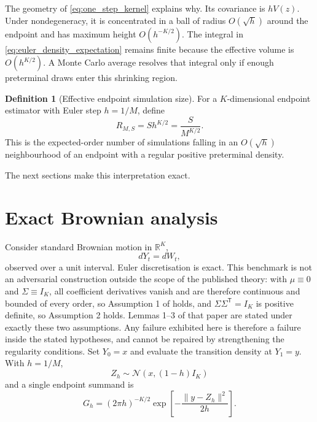 \documentclass[11pt]{article}
\theoremstyle{definition}
\newtheorem{definition}{Definition}
\newcommand{\R}{\mathbb{R}}
\newcommand{\Normal}{\mathcal{N}}
\begin{document}
The geometry of \eqref{eq:one_step_kernel} explains why. Its covariance is $hV(z)$. Under nondegeneracy, it is concentrated in a ball of radius $O(\sqrt h)$ around the endpoint and has maximum height $O(h^{-K/2})$. The integral in \eqref{eq:euler_density_expectation} remains finite because the effective volume is $O(h^{K/2})$. A Monte Carlo average resolves that integral only if enough preterminal draws enter this shrinking region.

\begin{definition}[Effective endpoint simulation size]\label{def:effective_size}
For a $K$-dimensional endpoint estimator with Euler step $h=1/M$, define
\begin{equation}\label{eq:effective_size}
R_{M,S}=S h^{K/2}=\frac{S}{M^{K/2}}.
\end{equation}
This is the expected-order number of simulations falling in an $O(\sqrt h)$ neighbourhood of an endpoint with a regular positive preterminal density.
\end{definition}

The next sections make this interpretation exact.

\section{Exact Brownian analysis}\label{sec:brownian}

Consider standard Brownian motion in $\R^K$,
\begin{equation}\label{eq:brownian}
dY_t=dW_t,
\end{equation}
observed over a unit interval. Euler discretisation is exact. This benchmark is not an adversarial construction outside the scope of the published theory: with $\mu\equiv0$ and $\Sigma\equiv I_K$, all coefficient derivatives vanish and are therefore continuous and bounded of every order, so Assumption 1 of \citet{BrandtSantaClara2002} holds, and $\Sigma\Sigma^{\mathsf T}=I_K$ is positive definite, so Assumption 2 holds. Lemmas 1--3 of that paper are stated under exactly these two assumptions. Any failure exhibited here is therefore a failure inside the stated hypotheses, and cannot be repaired by strengthening the regularity conditions. Set $Y_0=x$ and evaluate the transition density at $Y_1=y$. With $h=1/M$,
\[
Z_h\sim\Normal(x,(1-h)I_K)
\]
and a single endpoint summand is
\begin{equation}\label{eq:brownian_summand}
G_h
=(2\pi h)^{-K/2}
\exp\!\left[-\frac{\|y-Z_h\|^2}{2h}\right].
\end{equation}
\end{document}
